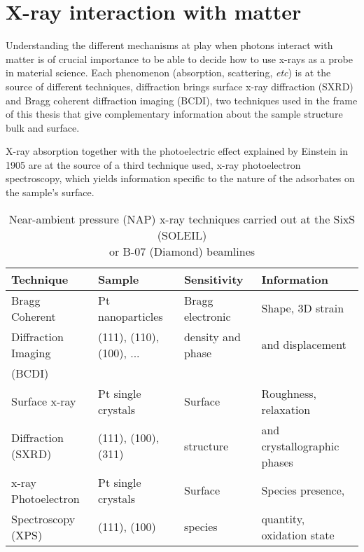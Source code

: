 \newpage
\section{X-ray interaction with matter} \label{sec:XRIntMatter}

Understanding the different mechanisms at play when photons interact with matter is of crucial importance to be able to decide how to use x-rays as a probe in material science.
Each phenomenon (absorption, scattering, \textit{etc}) is at the source of different techniques, diffraction brings surface x-ray diffraction (SXRD) and Bragg coherent diffraction imaging (BCDI), two techniques used in the frame of this thesis that give complementary information about the sample structure bulk and surface.

X-ray absorption together with the photoelectric effect explained by Einstein in 1905 are at the source of a third technique used, x-ray photoelectron spectroscopy, which yields information specific to the nature of the adsorbates on the sample's surface.

\begin{table}[!htb]
    \centering
    \small
    \begin{tabular}{l|l|l|l}
        Technique & Sample & Sensitivity & Information \\
        \toprule
        Bragg Coherent & Pt nanoparticles & Bragg electronic & Shape, 3D strain  \\
        Diffraction Imaging & (111), (110), (100), ... & density and phase & and displacement \\
        (BCDI) &  &  & \\
        \midrule
        Surface x-ray & Pt single crystals & Surface & Roughness, relaxation \\
        Diffraction (SXRD) & (111), (100), (311) & structure & and crystallographic phases \\
        \midrule
        x-ray Photoelectron & Pt single crystals & Surface & Species presence, \\
        Spectroscopy (XPS) & (111), (100) & species & quantity, oxidation state \\
        \bottomrule
    \end{tabular}
    \caption{Near-ambient pressure (NAP) x-ray techniques carried out at the SixS (SOLEIL) \\ or B-07 (Diamond) beamlines}
    \label{tab:techniques}
\end{table}


